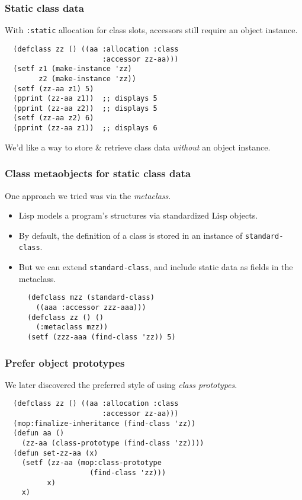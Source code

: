 \documentclass{beamer}
\begin{document}
\begin{frame}[fragile]
  \frametitle{Static class data}

  With \texttt{:static} allocation for class slots, accessors still
  require an object instance.
  {\small\begin{verbatim}
  (defclass zz () ((aa :allocation :class
                       :accessor zz-aa)))
  (setf z1 (make-instance 'zz)
        z2 (make-instance 'zz))
  (setf (zz-aa z1) 5)
  (pprint (zz-aa z1))  ;; displays 5
  (pprint (zz-aa z2))  ;; displays 5
  (setf (zz-aa z2) 6)
  (pprint (zz-aa z1))  ;; displays 6
\end{verbatim}}
  We'd like a way to store \& retrieve class data \emph{without} an
  object instance.
\end{frame}

\begin{frame}[fragile]
  \frametitle{Class metaobjects for static class data}

  One approach we tried was via the \emph{metaclass}.
  \begin{itemize}
  \item Lisp models a program's structures via standardized Lisp objects.
  \item By default, the definition of a class is stored in an instance
    of \texttt{standard-class}.
  \item But we can extend \texttt{standard-class}, and include static
    data as fields in the metaclass.
  {\small\begin{verbatim}
  (defclass mzz (standard-class)
    ((aaa :accessor zzz-aaa)))
  (defclass zz () () 
    (:metaclass mzz))
  (setf (zzz-aaa (find-class 'zz)) 5)
\end{verbatim}}
  \end{itemize}  
\end{frame}

\begin{frame}[fragile]
  \frametitle{Prefer object prototypes}

  We later discovered the preferred style of using \emph{class
    prototypes}.
  {\small\begin{verbatim}
  (defclass zz () ((aa :allocation :class
                       :accessor zz-aa)))
  (mop:finalize-inheritance (find-class 'zz))
  (defun aa ()
    (zz-aa (class-prototype (find-class 'zz))))
  (defun set-zz-aa (x)
    (setf (zz-aa (mop:class-prototype
                    (find-class 'zz)))
          x)
    x)
\end{verbatim}}
\end{frame}
\end{document}

